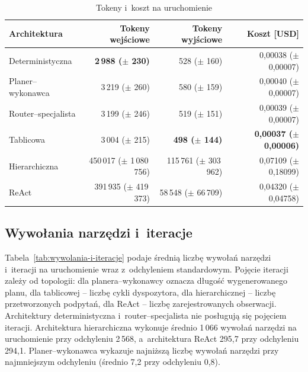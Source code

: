 \begin{table}[H]
  \caption{Tokeny i~koszt na uruchomienie}\label{tab:tokeny-i-koszt}
  \centering
  \small
  \renewcommand{\arraystretch}{1.3}
  \begin{tabular}{@{} l r r r @{}}
    \toprule
    \textbf{Architektura}
    & \textbf{Tokeny wejściowe}      & \textbf{Tokeny wyjściowe}   & \textbf{Koszt [USD]}                  \\
    \midrule
    Deterministyczna    & \textbf{2\,988 (\(\pm\) 230)}  & 528 (\(\pm\) 160)           & 0{,}00038 (\(\pm\) 0{,}00007)          \\
    Planer--wykonawca   & 3\,219 (\(\pm\) 260)           & 580 (\(\pm\) 159)           & 0{,}00040 (\(\pm\) 0{,}00007)          \\
    Router--specjalista & 3\,199 (\(\pm\) 246)           & 519 (\(\pm\) 151)           & 0{,}00039 (\(\pm\) 0{,}00007)          \\
    Tablicowa           & 3\,004 (\(\pm\) 215)           & \textbf{498 (\(\pm\) 144)}  & \textbf{0{,}00037 (\(\pm\) 0{,}00006)} \\
    Hierarchiczna       & 450\,017 (\(\pm\) 1\,080\,756) & 115\,761 (\(\pm\) 303\,962) & 0{,}07109 (\(\pm\) 0{,}18099)          \\
    ReAct               & 391\,935 (\(\pm\) 419\,373)    & 58\,548 (\(\pm\) 66\,709)   & 0{,}04320 (\(\pm\) 0{,}04758)          \\
    \bottomrule
  \end{tabular}
\end{table}

\subsection{Wywołania narzędzi i~iteracje}\label{subsec:wywolania-i-iteracje}

Tabela~\ref{tab:wywolania-i-iteracje} podaje średnią liczbę wywołań narzędzi
i~iteracji na uruchomienie wraz z~odchyleniem standardowym. Pojęcie iteracji
zależy od topologii: dla planera--wykonawcy oznacza długość wygenerowanego
planu, dla tablicowej -- liczbę cykli dyspozytora, dla hierarchicznej -- liczbę
przetworzonych podpytań, dla ReAct -- liczbę zarejestrowanych obserwacji.
Architektury deterministyczna i~router--specjalista nie posługują się pojęciem
iteracji. Architektura hierarchiczna wykonuje średnio 1\,066 wywołań narzędzi
na uruchomienie przy odchyleniu 2\,568, a~architektura ReAct 295{,}7 przy
odchyleniu 294{,}1. Planer--wykonawca wykazuje najniższą liczbę wywołań
narzędzi przy najmniejszym odchyleniu (średnio 7{,}2 przy odchyleniu 0{,}8).

